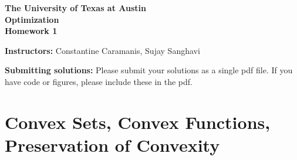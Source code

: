 \documentclass{article}
\begin{document}
\begin{center}
\Large\textbf{The University of Texas at Austin}\\[0.5em]
\large\textbf{Optimization}\\[0.5em]
\large\textbf{Homework 1}
\end{center}

\vspace{1em}

\textbf{Instructors:} Constantine Caramanis, Sujay Sanghavi

\vspace{1em}

\textbf{Submitting solutions:} Please submit your solutions as a single pdf file. If you have code or figures, please include these in the pdf.

\section{Convex Sets, Convex Functions, Preservation of Convexity}
\end{document}
